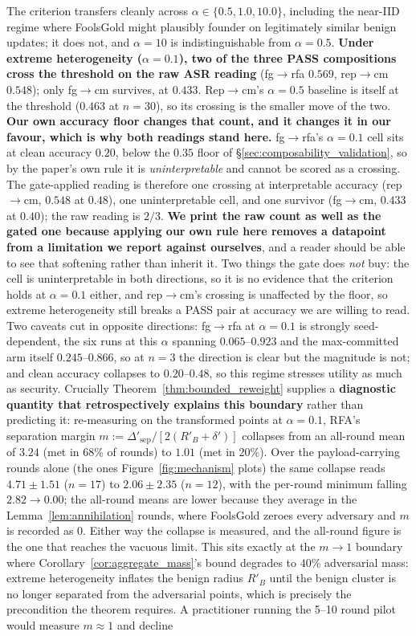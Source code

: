 \documentclass{article}
\begin{document}
\noindent The criterion transfers cleanly across $\alpha \in \{0.5, 1.0, 10.0\}$, including the near-IID regime where FoolsGold might plausibly founder on legitimately similar benign updates; it does not, and $\alpha{=}10$ is indistinguishable from $\alpha{=}0.5$. \textbf{Under extreme heterogeneity ($\alpha{=}0.1$), two of the three PASS compositions cross the threshold on the raw ASR reading} (fg$\to$rfa $0.569$, rep$\to$cm $0.548$); only fg$\to$cm survives, at $0.433$. Rep$\to$cm's $\alpha{=}0.5$ baseline is itself at the threshold ($0.463$ at $n{=}30$), so its crossing is the smaller move of the two. \textbf{Our own accuracy floor changes that count, and it changes it in our favour, which is why both readings stand here.} fg$\to$rfa's $\alpha{=}0.1$ cell sits at clean accuracy $0.20$, below the $0.35$ floor of §\ref{sec:composability_validation}, so by the paper's own rule it is \emph{uninterpretable} and cannot be scored as a crossing. The gate-applied reading is therefore one crossing at interpretable accuracy (rep$\to$cm, $0.548$ at $0.48$), one uninterpretable cell, and one survivor (fg$\to$cm, $0.433$ at $0.40$); the raw reading is $2/3$. \textbf{We print the raw count as well as the gated one because applying our own rule here removes a datapoint from a limitation we report against ourselves}, and a reader should be able to see that softening rather than inherit it. Two things the gate does \emph{not} buy: the cell is uninterpretable in both directions, so it is no evidence that the criterion holds at $\alpha{=}0.1$ either, and rep$\to$cm's crossing is unaffected by the floor, so extreme heterogeneity still breaks a PASS pair at accuracy we are willing to read. Two caveats cut in opposite directions: fg$\to$rfa at $\alpha{=}0.1$ is strongly seed-dependent, the six runs at this $\alpha$ spanning $0.065$--$0.923$ and the max-committed arm itself $0.245$--$0.866$, so at $n{=}3$ the direction is clear but the magnitude is not; and clean accuracy collapses to $0.20$--$0.48$, so this regime stresses utility as much as security. Crucially Theorem~\ref{thm:bounded_reweight} supplies a \textbf{diagnostic quantity that retrospectively explains this boundary} rather than predicting it: re-measuring on the transformed points at $\alpha{=}0.1$, RFA's separation margin $m := \Delta'_{\mathrm{sep}}/[2(R'_B+\delta')]$ collapses from an all-round mean of $3.24$ (met in 68\% of rounds) to $1.01$ (met in 20\%). Over the payload-carrying rounds alone (the ones Figure~\ref{fig:mechanism} plots) the same collapse reads $4.71 \pm 1.51$ ($n{=}17$) to $2.06 \pm 2.35$ ($n{=}12$), with the per-round minimum falling $2.82 \to 0.00$; the all-round means are lower because they average in the Lemma~\ref{lem:annihilation} rounds, where FoolsGold zeroes every adversary and $m$ is recorded as $0$. Either way the collapse is measured, and the all-round figure is the one that reaches the vacuous limit. This sits exactly at the $m \to 1$ boundary where Corollary~\ref{cor:aggregate_mass}'s bound degrades to $40\%$ adversarial mass: extreme heterogeneity inflates the benign radius $R'_B$ until the benign cluster is no longer separated from the adversarial points, which is precisely the precondition the theorem requires. A practitioner running the 5--10 round pilot would measure $m \approx 1$ and decline 
\end{document}
